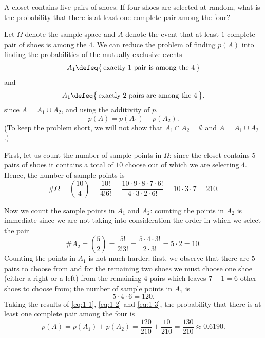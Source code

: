\begin{problem}
  A closet contains five pairs of shoes. If four shoes are selected at
  random, what is the probability that there is at least one complete pair
  among the four?
\end{problem}
\begin{solution}
  Let \(\Omega\) denote the sample space and \(A\) denote the event that at
  least \(1\) complete pair of shoes is among the \(4\). We can reduce the
  problem of finding \(p(A)\) into finding the probabilities of the
  mutually exclusive events
 \[
   A_1\defeq\bigl\{\,\text{exactly \(1\) pair is among the \(4\)}\,\bigr\}
  \]
  and
  \[
    A_1\defeq\bigl\{\,\text{exactly \(2\) pairs are among the
      \(4\)}\,\bigr\}.
  \]
  since \(A=A_1\cup A_2\), and using the additivity of \(p\),
  \[
    p(A)=p(A_1)+p(A_2).
  \]
  (To keep the problem short, we will not show that
  \(A_1\cap A_2=\emptyset\) and \(A=A_1\cup A_2\).)

  First, let us count the number of sample points in \(\Omega\): since the
  closet contains \(5\) pairs of shoes it contains a total of \(10\) choose
  out of which we are selecting \(4\). Hence, the number of sample points
  is
  \begin{equation}
    \label{eq:1-1}
    \#\Omega=%
    \binom{10}{4}=%
    \frac{10!}{4!6!}=%
    \frac{10\cdot 9\cdot 8\cdot 7\cdot 6!}{4\cdot 3\cdot 2\cdot 6!}=%
    10\cdot 3\cdot 7=%
    210.
  \end{equation}

  Now we count the sample points in \(A_1\) and \(A_2\): counting the
  points in \(A_2\) is immediate since we are not taking into consideration
  the order in which we select the pair
  \begin{equation}
    \label{eq:1-2}
    \#A_2=%
    \binom{5}{2}=%
    \frac{5!}{2!3!}=%
    \frac{5\cdot 4\cdot 3!}{2\cdot 3!}=%
    5\cdot 2=10.
  \end{equation}
  Counting the points in \(A_1\) is not much harder:
  first, we observe that there are \(5\) pairs to
  choose from and for the remaining two shoes we must choose one shoe
  (either a right or a left) from the remaining \(4\) pairs which leaves
  \(7-1=6\) other shoes to choose from; \ie{} the number of sample points
  in \(A_1\) is
  \begin{equation}
    \label{eq:1-3}
    5\cdot 4\cdot 6=120.
  \end{equation}
  Taking the results of \eqref{eq:1-1}, \eqref{eq:1-2} and \eqref{eq:1-3},
  the probability that there is at least one complete pair among the four
  is
  \[
    p(A)=%
    p(A_1)+p(A_2)=%
    \frac{120}{210}+\frac{10}{210}=\frac{130}{210}\approx%
    0.6190.
  \]
\end{solution}
\newpage

